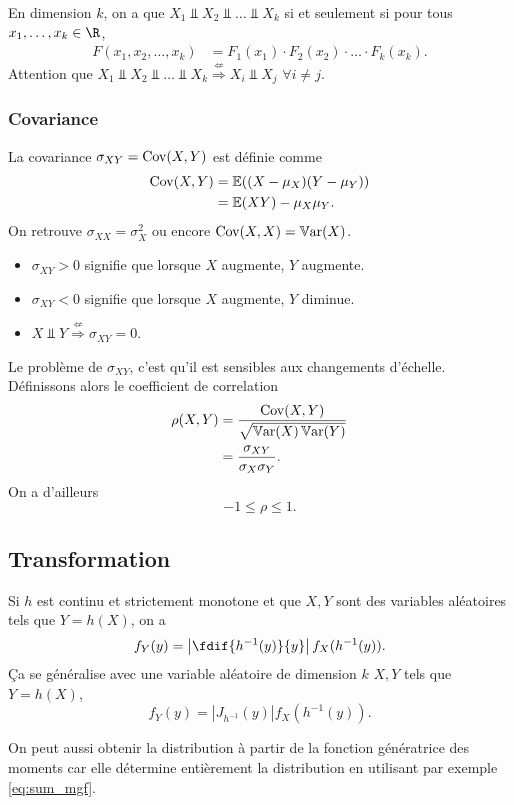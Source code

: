 En dimension $k$, on a que $X_1 \Perp X_2 \Perp \ldots \Perp X_k$
si et seulement si pour tous $x_1, \ldots, x_k \in \R$,
\begin{align*}
  F(x_1, x_2, \ldots, x_k) & = F_1(x_1) \cdot F_2(x_2) \cdot \ldots \cdot F_k(x_k).
\end{align*}
Attention que $X_1 \Perp X_2 \Perp \ldots \Perp X_k \stackrel{\nLeftarrow}{\Rightarrow} X_i \Perp X_j$ $\forall i \neq j$.

\subsubsection{Covariance}
La covariance $\sigma_{XY} = \operatorname{Cov}(X, Y)$ est définie comme
\begin{align*}
  \operatorname{Cov}(X, Y) & = \mathbb{E}((X-\mu_X)(Y-\mu_Y))\\
             & = \mathbb{E}(XY) - \mu_X \mu_Y.
\end{align*}
On retrouve $\sigma_{XX} = \sigma_{X}^2$ ou encore $\operatorname{Cov}(X,X) = \operatorname{\mathbb{V}ar}(X)$.
\begin{itemize}
  \item $\sigma_{XY} > 0$ signifie que lorsque $X$ augmente, $Y$ augmente.
  \item $\sigma_{XY} < 0$ signifie que lorsque $X$ augmente, $Y$ diminue.
  \item $X \Perp Y \stackrel{\nLeftarrow}{\Rightarrow} \sigma_{XY} = 0$.
\end{itemize}

Le problème de $\sigma_{XY}$, c'est qu'il est sensibles aux changements d'échelle.
Définissons alors le coefficient de correlation
\begin{align*}
  \rho(X, Y) & = \frac{\operatorname{Cov}(X,Y)}{\sqrt{\operatorname{\mathbb{V}ar}(X)\operatorname{\mathbb{V}ar}(Y)}}\\
             & = \frac{\sigma_{XY}}{\sigma_X \sigma_Y}.
\end{align*}
On a d'ailleurs
\[ -1 \leq \rho \leq 1. \]

\subsection{Transformation}
Si $h$ est continu et strictement monotone et que $X,Y$ sont des variables aléatoires tels que $Y = h(X)$,
on a
\[ f_Y(y) = \left|\fdif{h^{-1}(y)}{y}\right|f_X(h^{-1}(y)). \]
Ça se généralise avec une variable aléatoire de dimension $k$ $X, Y$ tels que $Y = h(X)$,
\[ f_Y(y) = \left|J_{h^{-1}}(y)\right|f_X(h^{-1}(y)). \]

On peut aussi obtenir la distribution à partir de la fonction génératrice des moments car
elle détermine entièrement la distribution en utilisant par exemple \eqref{eq:sum_mgf}.

